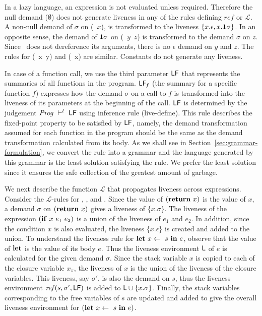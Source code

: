 \documentclass[9pt,preprint,nonatbib]{sigplanconf}
\begin{document}
In  a   lazy  language,   an  expression   is  not   evaluated  unless
required. Therefore  the null  demand ($\emptyset$) does  not generate
liveness in any of the rules defining $\mathit{ref}$ or $\mathcal{L}$.
A non-null  demand of  $\sigma$ on (\CDR~$x$),  is transformed  to the
liveness $\{x.\epsilon,  x.\mathbf{1}\sigma\}$.  In an opposite  sense, the
demand  of  $\mathbf{1}\sigma$ on  (\CONS~$y$~$z$)  is  transformed to  the
demand  $\sigma$  on  $z$.   Since \CONS\  does  not  dereference  its
arguments, there  is no $\epsilon$ demand  on $y$ and $z$.   The rules
for (\PRIM~x~y) and (\NULLQ~x) are  similar. Constants do not generate
any liveness.



In case of a  function call, we  use the third  parameter $\mathsf{LF}$
that  represents  the  summaries  of all  functions  in  the  program.
$\mathsf{LF}_{\mathit  f}$  (the summary for a  specific
function $f$) expresses  how the demand $\sigma$ on a  call to $f$ is
transformed into  the liveness of  its parameters at the  beginning of
the  call.  $\mathsf{LF}$  is determined  by the  judgement $\mathit{Prog}
\ \vdash^l\   \mathsf{LF}$ using  inference rule  ({\sc live-define}).   This rule
describes  the  fixed-point property  to  be  satisfied by  $\mathsf{LF}$,
namely, the  demand transformation  assumed for  each function  in the
program should  be the  same as  the demand  transformation calculated
from      its      body.       As       we      shall      see      in
Section~\ref{sec:grammar-formulation},  we  convert  the rule  into  a
grammar and  the language generated  by this grammar is  the least
solution satisfying  the rule. We  prefer the least solution  since it
ensures the safe collection of the greatest amount of garbage.

We next  describe the function $\mathcal{L}$  that propagates liveness
across  expressions.   Consider  the $\mathcal{L}$-rules  for  {\LET},
{\SIF}, and {\SRETURN}.  Since the value of $(\mbox{$\mathbf{ return}$}~x)$ is the
value  of  $x$,  a  demand $\sigma$  on  $(\mbox{$\mathbf{ return}$}~x)$  gives  a
liveness   of  $\{x.\sigma\}$.    The  liveness   of  the   expression
$(\mbox{$\mathbf{ if}$}~x~e_1~e_2)$  is  a union  of  the  liveness of  $e_1$  and
$e_2$. In  addition, since  the condition $x$  is also  evaluated, the
liveness $\{x.\epsilon\}$ is created and  added to the union.  
To  understand  the  liveness rule  for  $\mbox{$\mathbf{ let}$}~x  \leftarrow~s~\mbox{$\mathbf{ in}$}~e$,
observe that the value  of $\mbox{$\mathbf{ let}$}$ is the value of  its body $e$.  Thus
the  liveness environment  $\mathsf{L}$ of  $e$ is  calculated for  the given
demand $\sigma$. Since the stack variable $x$ is copied to each of the
closure variable  $x_{\pi}$, the liveness of  $x$ is the union  of the
liveness of the  closure variables.  This liveness,  say $\sigma'$, is
also  the  demand  on  $s$, thus the  liveness  environment
$\mathit{ref}(s,   \sigma',   \mathsf{LF})$   is  added   to   $\mathsf{L}   \cup
\{x.\sigma\}$. Finally, the stack variables corresponding to the free
variables of $s$ are updated and added 
  to  give the  overall liveness environment  for $(\mbox{$\mathbf{ let}$}~x
\leftarrow~s~\mbox{$\mathbf{ in}$}~e)$.
\end{document}
